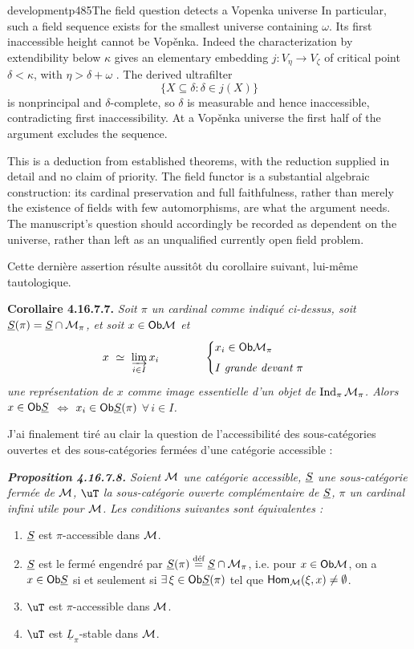 \begin{dcomment}{development}{p485}{The field question detects a Vopenka universe}
In particular, such a field sequence exists for the smallest universe containing $\omega$. Its first inaccessible height cannot be Vop\v{e}nka. Indeed the characterization by extendibility below $\kappa$ gives an elementary embedding $j:V_\eta\to V_\zeta$ of critical point $\delta<\kappa$, with $\eta>\delta+\omega$ \citep[Proposition~7]{BrookeTaylor2011Vopenka}. The derived ultrafilter
\[
\{X\subseteq\delta:\delta\in j(X)\}
\]
is nonprincipal and $\delta$-complete, so $\delta$ is measurable and hence inaccessible, contradicting first inaccessibility. At a Vop\v{e}nka universe the first half of the argument excludes the sequence.

This is a deduction from established theorems, with the reduction supplied in detail and no claim of priority. The field functor is a substantial algebraic construction: its cardinal preservation and full faithfulness, rather than merely the existence of fields with few automorphisms, are what the argument needs. The manuscript's question should accordingly be recorded as dependent on the universe, rather than left as an unqualified currently open field problem.
\end{dcomment}


Cette dernière assertion résulte aussitôt du corollaire suivant, lui-même tautologique.

\textbf{Corollaire 4.16.7.7.} \textit{Soit $\pi$ un cardinal comme indiqué ci-dessus, soit $\underline{S}(\pi) = \underline{S} \cap \mathcal{M}_\pi$, et soit $x \in \mathsf{Ob} \mathcal{M}$ et
\[
x \ \simeq\ \varinjlim_{i\in I} x_i \qquad\qquad
\begin{cases}
x_i \in \mathsf{Ob} \mathcal{M}_\pi \\[1ex]
I \ \textit{grande devant}\ \pi
\end{cases}
\]
une représentation de $x$ comme image essentielle d'un objet de $\operatorname{Ind}_\pi \mathcal{M}_\pi$. Alors $x \in \mathsf{Ob} \underline{S}$ $\Longleftrightarrow$ $x_i \in \mathsf{Ob} \underline{S}(\pi)$ $\forall\, i \in I$.}

J'ai finalement tiré au clair la question de l'accessibilité des sous-catégories ouvertes et des sous-catégories fermées d'une catégorie accessible :

\begingroup\itshape
\noindent\textbf{\upshape Proposition 4.16.7.8.} Soient $\mathcal{M}$ une catégorie accessible, $\underline{S}$ une sous-catégorie fermée de $\mathcal{M}$, $\uT$ la sous-catégorie ouverte complémentaire de $\underline{S}$, $\pi$ un cardinal infini utile pour $\mathcal{M}$. Les conditions suivantes sont équivalentes :
\begin{enumerate}[label={}]
\item[a)] $\underline{S}$ est $\pi$-accessible dans $\mathcal{M}$.
\item[a$'$)] $\underline{S}$ est le fermé engendré par $\underline{S}(\pi) \overset{\text{\upshape déf}}{=} \underline{S} \cap \mathcal{M}_\pi$, i.e. pour $x \in \mathsf{Ob} \mathcal{M}$, on a $x \in \mathsf{Ob} \underline{S}$ si et seulement si $\exists\, \xi \in \mathsf{Ob} \underline{S}(\pi)$ tel que $\mathsf{Hom}_{\mathcal{M}}(\xi, x) \neq \emptyset$.
\item[b)] $\uT$ est $\pi$-accessible dans $\mathcal{M}$.
\item[b$'$)] $\uT$ est $\underline{L}_\pi$-stable dans $\mathcal{M}$.
\end{enumerate}
\endgroup

